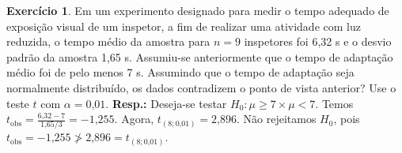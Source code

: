 \documentclass[]{article}
\theoremstyle{definition}
\newtheorem{ex}{Exercício}
\begin{document}
\begin{ex}
Em um experimento designado para medir o tempo adequado de exposição visual de um inspetor, a ﬁm de realizar uma atividade com luz reduzida, o tempo médio da amostra para $n = 9$ inspetores foi 6,32 s e o desvio padrão da amostra 1,65 s. Assumiu-se anteriormente que o tempo de adaptação médio foi de pelo menos 7 s. Assumindo que o tempo de adaptação seja normalmente distribuído, os dados contradizem o ponto de vista anterior? Use o teste $t$ com $\alpha = 0\text{,}01$. \textbf{Resp.:} Deseja-se testar $H_0 : \mu \geq 7 \times \mu < 7$. Temos $t_{\text{obs}} = \frac{6\text{,}32 - 7}{1\text{,}65/3} = -1\text{,}255$. Agora, $t_{(8; 0\text{,}01)} = 2\text{,}896$. Não rejeitamos $H_0$, pois $t_{\text{obs}} = -1\text{,}255 \not> 2\text{,}896 = t_{(8; 0\text{,}01)}$.
\end{ex}
\end{document}
